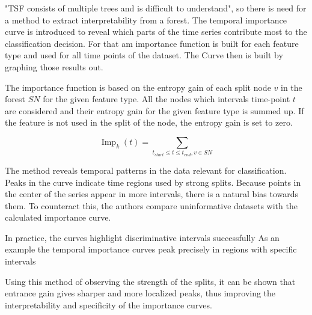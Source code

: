 "TSF consists of multiple trees and is difficult to understand", so 
there is need for a method to extract interpretability from a 
forest. The temporal importance curve is introduced to reveal which parts of the 
time series contribute most to the classification decision. For that am importance function is built for each feature type and
used for all time points of the dataset. The Curve then is built by graphing those results out.

The importance function is based on the entropy gain of each split node $v$ in the forest $SN$ for the given feature type. All the 
nodes which intervals time-point $t$ are considered and their entropy gain for the given feature type is 
summed up. If the feature is not used in the split of the node, the entropy gain is set to zero.

\[
	\operatorname{Imp}_k(t) = \sum_{t_{start} \leq t \leq t_{end}, v \in SN}
\]

The method reveals temporal patterns in the data relevant for classification. Peaks in the curve indicate time regions used by strong splits.
Because points in the center of the series appear in more intervals, there is a natural bias towards them. To counteract this, the authors compare
uninformative datasets with the calculated importance curve. %

In practice, the curves highlight discriminative intervals successfully %
As an example %
the temporal importance curves peak precisely in regions with specific intervals %

Using this method of observing the strength of the splits, it can be shown that entrance gain gives sharper and 
more localized peaks, thus improving the interpretability and specificity of the importance curves.